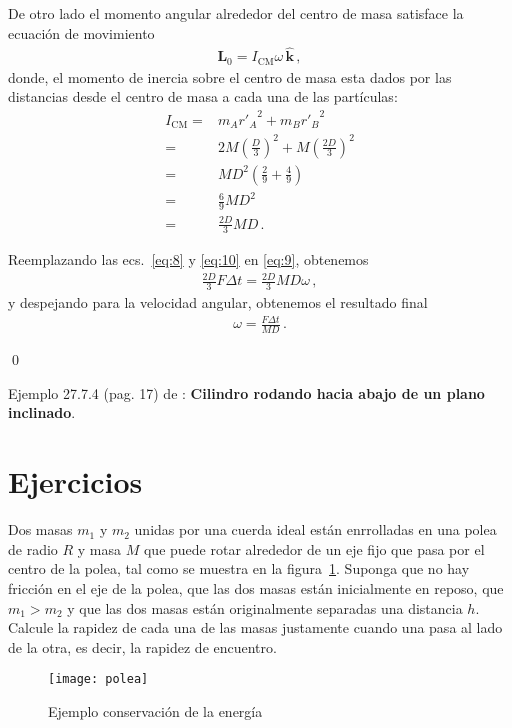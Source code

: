\begin{enumerate}
De otro lado el momento angular alrededor del centro de masa satisface la ecuación de movimiento
\begin{align}
  \label{eq:9}
  \mathbf{L}_0=I_{\text{CM}}\omega\,\hat{\mathbf{k}}\,,
\end{align}
donde, el momento de inercia sobre el centro de masa esta dados por las distancias desde el centro de masa a cada una de las partículas:
\begin{align}
  \label{eq:10}
  I_{\text{CM}}=&m_A {r'_{A}}^2+m_B {r'_{B}}^2\nonumber\\
  =&2M \left(\frac{D}{3}\right)^2+M\left(\frac{2D}{3}\right)^2\nonumber\\
  =&M D^2 \left(\frac{2}{9}+\frac{4}{9}\right)\nonumber\\
   =&\frac{6}{9}M D^2 \nonumber\\
   =&\frac{2D}{3}M D\,.
\end{align}

Reemplazando las ecs.~\eqref{eq:8} y \eqref{eq:10} en \eqref{eq:9}, obtenemos
\begin{align}
  \frac{2D}{3} F\Delta t=\frac{2D}{3}M D \omega\,,
\end{align}
y despejando para la velocidad angular, obtenemos el resultado final
\begin{align}
  \omega=\frac{F\Delta t}{M D}\,.
\end{align}

  \end{enumerate}
\qed


\ejemplo{}
Ejemplo 27.7.4 (pag. 17) de \cite{mit2009}: \textbf{Cilindro rodando hacia abajo de un plano inclinado}.



\section{Ejercicios}

\ejercicio{}
Dos masas $m_1$ y $m_2$ unidas por una cuerda ideal están enrrolladas en una polea de radio $R$ y masa $M$ que puede rotar alrededor de un eje fijo que pasa por el centro de la polea, tal como se muestra en la figura~\ref{fig:polea}. Suponga que no hay fricción en el eje de la polea, que las dos masas están inicialmente en reposo, que $m_1 > m_2$ y que las dos masas están originalmente separadas una distancia $h$. Calcule la rapidez de cada una de las masas justamente cuando una pasa al lado de la otra, es decir, la rapidez de encuentro.

  \begin{figure}
    \centering
    \texttt{[image: polea]}
    \caption{Ejemplo conservación de la energía}
    \label{fig:polea}
  \end{figure}



